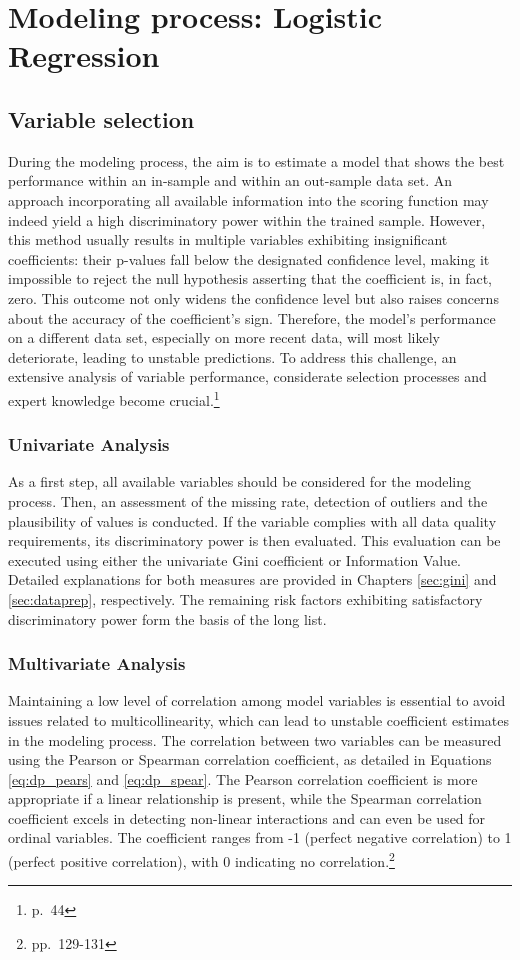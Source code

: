 \section{Modeling process: Logistic Regression}

\subsection{Variable selection}
During the modeling process, the aim is to estimate a model that shows the best performance within an in-sample and within an out-sample data set. An approach incorporating all available information into the scoring function may indeed yield a high discriminatory power within the trained sample. However, this method usually results in multiple variables exhibiting insignificant coefficients: their p-values fall below the designated confidence level, making it impossible to reject the null hypothesis asserting that the coefficient is, in fact, zero. This outcome not only widens the confidence level but also raises concerns about the accuracy of the coefficient's sign. Therefore, the model's performance on a different data set, especially on more recent data, will most likely deteriorate, leading to unstable predictions. To address this challenge, an extensive analysis of variable performance, considerate selection processes and expert knowledge become crucial.\footnote{\cite{Witzany:2017} p.~44}

\subsubsection{Univariate Analysis}
As a first step, all available variables should be considered for the modeling process. Then, an assessment of the missing rate, detection of outliers and the plausibility of values is conducted. If the variable complies with all data quality requirements, its discriminatory power is then evaluated. This evaluation can be executed using either the univariate Gini coefficient or Information Value. Detailed explanations for both measures are provided in Chapters \ref{sec:gini} and \ref{sec:dataprep}, respectively. The remaining risk factors exhibiting satisfactory discriminatory power form the basis of the long list. 

\subsubsection{Multivariate Analysis}
Maintaining a low level of correlation among model variables is essential to avoid issues related to multicollinearity, which can lead to unstable coefficient estimates in the modeling process. The correlation between two variables can be measured using the Pearson or Spearman correlation coefficient, as detailed in Equations \ref{eq:dp_pears} and \ref{eq:dp_spear}. The Pearson correlation coefficient is more appropriate if a linear relationship is present, while the Spearman correlation coefficient excels in detecting non-linear interactions and can even be used for ordinal variables. The coefficient ranges from -1 (perfect negative correlation) to 1 (perfect positive correlation), with 0 indicating no correlation.\footnote{\cite{FUMS:2020} pp.~129-131}


